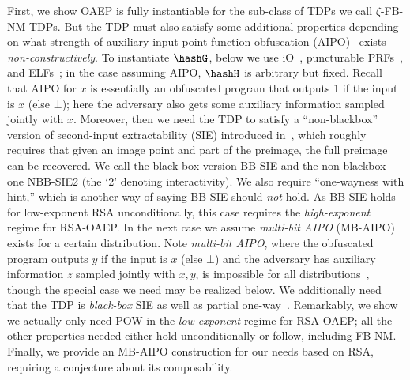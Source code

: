   


\iffalse

First, we show OAEP is fully instantiable for the sub-class of TDPs we call $\zeta$-FB-NM TDPs.  
But the TDP must also  satisfy some additional properties depending on what strength of auxiliary-input point-function obfuscation (AIPO)~\cite{C:Canetti97,TCC:BitPan12,TCC:BelSte16} exists \emph{non-constructively}. To instantiate $\hashG$, below we use iO~\cite{C:BGIRSVY01,SIAM:BGIRSVH16}, puncturable PRFs~\cite{STOC:SahWat14,CCS:KPTZ13,EC:BoyGilIsh15}, and ELFs~\cite{C:Zhandry16}; in the case assuming AIPO, $\hashH$ is arbitrary but fixed.
Recall that AIPO for $x$ is essentially an obfuscated program that outputs 1 if the input is $x$ (else $\bot$); here the adversary also gets some auxiliary information sampled jointly with $x$.
Moreover, then we need  the TDP to satisfy a ``non-blackbox'' version of second-input extractability (SIE) introduced in~\cite{CCS:BarPoiZan12}, which roughly requires that given an image point and part of the preimage, the full preimage can be recovered.  We call the black-box version BB-SIE and the non-blackbox one NBB-SIE2 (the `2' denoting interactivity). We also require ``one-wayness with hint,'' which is another way of saying BB-SIE should \emph{not} hold. As BB-SIE holds for low-exponent RSA unconditionally, this case requires the \emph{high-exponent} regime for RSA-OAEP. 
In the next case we assume  \emph{multi-bit AIPO} (MB-AIPO)~\cite{EC:CanDak08,AC:BrzMit14b} exists for a certain distribution. 
Note \emph{multi-bit AIPO}, where the obfuscated program outputs $y$ if the input is $x$ (else $\bot$) and the adversary has auxiliary information $z$ sampled jointly with $x,y$, is impossible for all distributions~\cite{AC:BrzMit14b}, though the special case we need may be realized below.
We additionally need that the TDP is \emph{black-box} SIE as well as partial one-way~\cite{C:FOPS01}.  Remarkably, we show we actually only need POW in the \emph{low-exponent} regime for RSA-OAEP; all the other properties needed either hold unconditionally or follow, including FB-NM. %
Finally, we provide an MB-AIPO construction for our needs based on RSA, requiring  a conjecture about its composability. %


